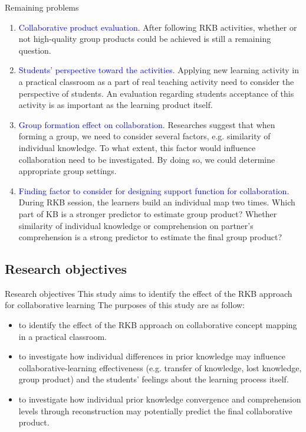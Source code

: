 \begin{frame}[allowframebreaks]{Remaining problems}
    \begin{enumerate}
        \item \textcolor<1>{blue}{Collaborative product evaluation.} 
        After following RKB activities, 
        whether or not high-quality group products could be achieved is still 
        a remaining question.  
        \item \textcolor<1>{blue}{Students' perspective toward the activities.} 
        Applying new learning activity 
        in a practical classroom as a part of real teaching activity need to 
        consider the perspective of students. An evaluation regarding 
        students acceptance of this activity is as important as the learning product itself. 
        \item \textcolor<1>{blue}{Group formation effect on collaboration.}
        Researches suggest that 
        when forming a group, we need to consider several factors, e.g. similarity 
        of individual knowledge.
        To what extent, this factor would influence collaboration need to be investigated.  By doing so, we could determine appropriate group settings. 
        \item \textcolor<1>{blue}{Finding factor to consider for designing support function for collaboration.}
        During RKB session, the learners build an individual map 
        two times. Which part of KB is a stronger predictor to estimate group 
        product? Whether similarity of individual knowledge or comprehension
        on partner's comprehension is a strong predictor to
        estimate the final group product? 
    \end{enumerate}
\end{frame}

\subsection{Research objectives}
\begin{frame}[allowframebreaks]{Research objectives}
    This study aims to identify the effect of the RKB approach
    for collaborative learning
    The purposes of this study are as follow:
    \begin{itemize}
        \item to identify the effect of the RKB approach on collaborative 
              concept mapping in a practical classroom.
        \item to investigate how individual differences in prior knowledge 
              may influence collaborative-learning effectiveness 
              (e.g. transfer of knowledge, lost knowledge, group product) 
              and the students' feelings about the learning process itself. 
        \item to investigate how individual prior knowledge convergence and comprehension 
            levels through reconstruction may potentially predict the final 
            collaborative product. 
    \end{itemize} 
\end{frame}